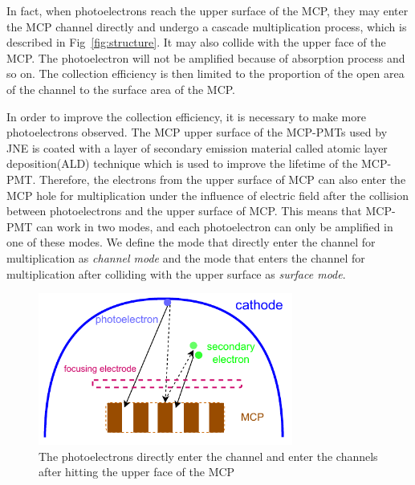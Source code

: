 \documentclass{article}
\begin{document}
In fact, when photoelectrons reach the upper surface of the MCP, 
they may enter the MCP channel directly and undergo a cascade multiplication process, 
which is described in Fig~\ref{fig:structure}. 
It may also collide with the upper face of the MCP.\@ 
The photoelectron will not be amplified because of absorption process and so on. 
The collection efficiency is then limited to the proportion of the open area of 
the channel to the surface area of the MCP.

In order to improve the collection efficiency, it is necessary to make more photoelectrons observed.
The MCP upper surface of the MCP-PMTs used by JNE is coated with a layer of secondary emission material 
called atomic layer deposition(ALD) technique which is used to improve the lifetime of the MCP-PMT\cite{2021Effects}. 
Therefore, the electrons from the upper surface of MCP can also enter the MCP hole for multiplication 
under the influence of electric field after the collision between photoelectrons and the upper surface of MCP. 
This means that MCP-PMT can work in two modes, and each photoelectron can only be amplified in one of these modes.
 We define the mode that directly enter the channel for multiplication as \textit{channel mode} and   
the mode that enters the channel for multiplication after colliding with the upper surface as \textit{surface mode}.
\begin{figure}[ht]
    \centering
    \includegraphics[height=5cm]{pic/MCPelectron.pdf}
    \caption{The photoelectrons directly enter the channel and enter the channels after hitting the upper face of the MCP}\label{fig:MCP}
\end{figure}
\end{document}
